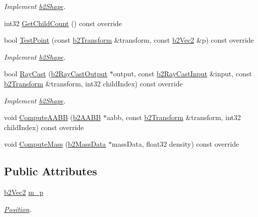 \begin{DoxyCompactItemize}
\begin{DoxyCompactList}\small\item\em Implement \hyperlink{classb2Shape}{b2\+Shape}. \end{DoxyCompactList}\item 
int32 \hyperlink{classb2CircleShape_a552db3402aed5d12c3177981e5208065}{Get\+Child\+Count} () const override
\item 
\mbox{\label{classb2CircleShape_a84e22b3807e84b72f2981010fc197099}} 
bool \hyperlink{classb2CircleShape_a84e22b3807e84b72f2981010fc197099}{Test\+Point} (const \hyperlink{structb2Transform}{b2\+Transform} \&transform, const \hyperlink{structb2Vec2}{b2\+Vec2} \&p) const override
\begin{DoxyCompactList}\small\item\em Implement \hyperlink{classb2Shape}{b2\+Shape}. \end{DoxyCompactList}\item 
\mbox{\label{classb2CircleShape_a442e847b9fc3d1344b02b48d490eb0c6}} 
bool \hyperlink{classb2CircleShape_a442e847b9fc3d1344b02b48d490eb0c6}{Ray\+Cast} (\hyperlink{structb2RayCastOutput}{b2\+Ray\+Cast\+Output} $\ast$output, const \hyperlink{structb2RayCastInput}{b2\+Ray\+Cast\+Input} \&input, const \hyperlink{structb2Transform}{b2\+Transform} \&transform, int32 child\+Index) const override
\begin{DoxyCompactList}\small\item\em Implement \hyperlink{classb2Shape}{b2\+Shape}. \end{DoxyCompactList}\item 
void \hyperlink{classb2CircleShape_af4a4ea78780af7a7ce40bf5d54affe83}{Compute\+A\+A\+BB} (\hyperlink{structb2AABB}{b2\+A\+A\+BB} $\ast$aabb, const \hyperlink{structb2Transform}{b2\+Transform} \&transform, int32 child\+Index) const override
\item 
void \hyperlink{classb2CircleShape_a7dc07891abd015863fbf03076e47eec5}{Compute\+Mass} (\hyperlink{structb2MassData}{b2\+Mass\+Data} $\ast$mass\+Data, float32 density) const override
\end{DoxyCompactItemize}
\subsection*{Public Attributes}
\begin{DoxyCompactItemize}
\item 
\mbox{\label{classb2CircleShape_a190705618b2e65f636f1dc03c63640ff}} 
\hyperlink{structb2Vec2}{b2\+Vec2} \hyperlink{classb2CircleShape_a190705618b2e65f636f1dc03c63640ff}{m\+\_\+p}
\begin{DoxyCompactList}\small\item\em \hyperlink{structPosition}{Position}. \end{DoxyCompactList}\end{DoxyCompactItemize}
